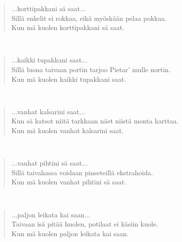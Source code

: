 \noindent\begin{minipage}{\linewidth}
\begin{verse}
	...korttipakkani sä saat...\\
	Sillä enkelit ei rokkaa, eikä myöskään pelaa pokkaa.\\
	Kun mä kuolen korttipakkani sä saat.\\
\end{verse}
\end{minipage}\\[10pt]
\noindent\begin{minipage}{\linewidth}
\begin{verse}
	...kaikki tupakkani saat...\\
	Sillä luona taivaan portin tarjoo Pietar' mulle nortin.\\
	Kun mä kuolen kaikki tupakkani saat.\\
\end{verse}
\end{minipage}\\[10pt]
\noindent\begin{minipage}{\linewidth}
\begin{verse}
	...vanhat kalsarini saat...\\
	Kun sä katsot niitä tarkkaan näet niistä monta karttaa.\\
	Kun mä kuolen vanhat kalsarini saat.\\
\end{verse}
\end{minipage}\\[10pt]
\noindent\begin{minipage}{\linewidth}
\begin{verse}
	...vanhat pihtini sä saat...\\
	Sillä taivahassa voidaan pinseteillä ekstrahoida.\\
	Kun mä kuolen vanhat pihtini sä saat.\\
\end{verse}
\end{minipage}\\[10pt]
\noindent\begin{minipage}{\linewidth}
\begin{verse}
	...paljon leikata kai saan...\\
	Taivaan isä pitää huolen, potilaat ei käsiin kuole.\\
	Kun mä kuolen paljon leikata kai saan.\\
\end{verse}
\end{minipage}\\[10pt]
